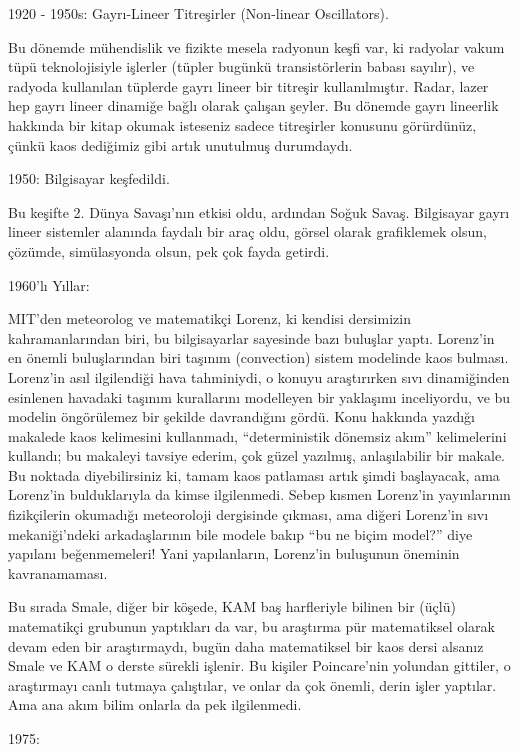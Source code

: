 \documentclass[12pt,fleqn]{article}\usepackage{../../common}
\begin{document}
1920 - 1950s: Gayrı-Lineer Titreşirler (Non-linear Oscillators). 

Bu dönemde mühendislik ve fizikte mesela radyonun keşfi var, ki radyolar vakum
tüpü teknolojisiyle işlerler (tüpler bugünkü transistörlerin babası sayılır), ve
radyoda kullanılan tüplerde gayrı lineer bir titreşir kullanılmıştır. Radar,
lazer hep gayrı lineer dinamiğe bağlı olarak çalışan şeyler. Bu dönemde gayrı
lineerlik hakkında bir kitap okumak isteseniz sadece titreşirler konusunu
görürdünüz, çünkü kaos dediğimiz gibi artık unutulmuş durumdaydı.

1950: Bilgisayar keşfedildi. 

Bu keşifte 2. Dünya Savaşı'nın etkisi oldu, ardından Soğuk Savaş. Bilgisayar
gayrı lineer sistemler alanında faydalı bir araç oldu, görsel olarak grafiklemek
olsun, çözümde, simülasyonda olsun, pek çok fayda getirdi.

1960'lı Yıllar: 

MIT'den meteorolog ve matematikçi Lorenz, ki kendisi dersimizin kahramanlarından
biri, bu bilgisayarlar sayesinde bazı buluşlar yaptı. Lorenz'in en önemli
buluşlarından biri taşınım (convection) sistem modelinde kaos bulması. Lorenz'in
asıl ilgilendiği hava tahminiydi, o konuyu araştırırken sıvı dinamiğinden
esinlenen havadaki taşınım kurallarını modelleyen bir yaklaşımı inceliyordu, ve
bu modelin öngörülemez bir şekilde davrandığını gördü. Konu hakkında yazdığı
makalede kaos kelimesini kullanmadı, ``deterministik dönemsiz akım''
kelimelerini kullandı; bu makaleyi tavsiye ederim, çok güzel yazılmış,
anlaşılabilir bir makale. Bu noktada diyebilirsiniz ki, tamam kaos patlaması
artık şimdi başlayacak, ama Lorenz'in bulduklarıyla da kimse ilgilenmedi. Sebep
kısmen Lorenz'in yayınlarının fizikçilerin okumadığı meteoroloji dergisinde
çıkması, ama diğeri Lorenz'in sıvı mekaniği'ndeki arkadaşlarının bile modele
bakıp ``bu ne biçim model?'' diye yapılanı beğenmemeleri! Yani yapılanların,
Lorenz'in buluşunun öneminin kavranamaması.

Bu sırada Smale, diğer bir köşede, KAM baş harfleriyle bilinen bir (üçlü)
matematikçi grubunun yaptıkları da var, bu araştırma pür matematiksel
olarak devam eden bir araştırmaydı, bugün daha matematiksel bir kaos dersi
alsanız Smale ve KAM o derste sürekli işlenir. Bu kişiler Poincare'nin
yolundan gittiler, o araştırmayı canlı tutmaya çalıştılar, ve onlar da çok
önemli, derin işler yaptılar. Ama ana akım bilim onlarla da pek
ilgilenmedi. 

1975: 
\end{document}

